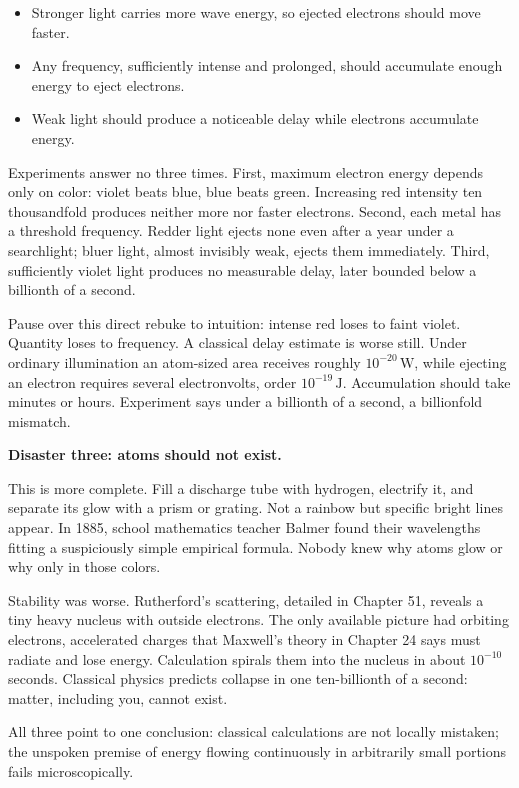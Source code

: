 \begin{itemize}[leftmargin=1.8em]
\item Stronger light carries more wave energy, so ejected electrons should move faster.
\item Any frequency, sufficiently intense and prolonged, should accumulate enough energy to eject electrons.
\item Weak light should produce a noticeable delay while electrons accumulate energy.
\end{itemize}

Experiments answer no three times. First, maximum electron energy depends only on color: violet beats blue, blue beats green. Increasing red intensity ten thousandfold produces neither more nor faster electrons. Second, each metal has a threshold frequency. Redder light ejects none even after a year under a searchlight; bluer light, almost invisibly weak, ejects them immediately. Third, sufficiently violet light produces no measurable delay, later bounded below a billionth of a second.

Pause over this direct rebuke to intuition: intense red loses to faint violet. Quantity loses to frequency. A classical delay estimate is worse still. Under ordinary illumination an atom-sized area receives roughly \(10^{-20}\,\mathrm{W}\), while ejecting an electron requires several electronvolts, order \(10^{-19}\,\mathrm{J}\). Accumulation should take minutes or hours. Experiment says under a billionth of a second, a billionfold mismatch.

\textbf{Disaster three: atoms should not exist.}

This is more complete. Fill a discharge tube with hydrogen, electrify it, and separate its glow with a prism or grating. Not a rainbow but specific bright lines appear. In 1885, school mathematics teacher Balmer found their wavelengths fitting a suspiciously simple empirical formula. Nobody knew why atoms glow or why only in those colors.

Stability was worse. Rutherford's scattering, detailed in Chapter 51, reveals a tiny heavy nucleus with outside electrons. The only available picture had orbiting electrons, accelerated charges that Maxwell's theory in Chapter 24 says must radiate and lose energy. Calculation spirals them into the nucleus in about \(10^{-10}\) seconds. Classical physics predicts collapse in one ten-billionth of a second: matter, including you, cannot exist.

All three point to one conclusion: classical calculations are not locally mistaken; the unspoken premise of energy flowing continuously in arbitrarily small portions fails microscopically.

